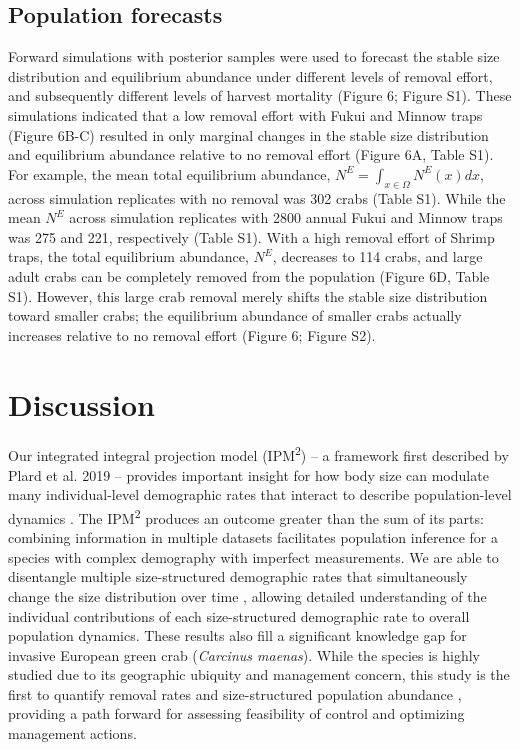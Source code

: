 \documentclass{article}
\begin{document}
\subsection{Population forecasts}

Forward simulations with posterior samples were used to forecast the stable size distribution and equilibrium abundance under different levels of removal effort, and subsequently different levels of harvest mortality (Figure 6; Figure S1). These simulations indicated that a low removal effort with Fukui and Minnow traps (Figure 6B-C) resulted in only marginal changes in the stable size distribution and equilibrium abundance relative to no removal effort (Figure 6A, Table S1). For example, the mean total equilibrium abundance, $N^{E} = \int_{x \in \Omega}N^E(x)dx$, across simulation replicates with no removal was 302 crabs (Table S1). While the mean $N^{E}$ across simulation replicates with 2800 annual Fukui and Minnow traps was 275 and 221, respectively (Table S1). With a high removal effort of Shrimp traps, the total equilibrium abundance, $N^{E}$, decreases to 114 crabs, and large adult crabs can be completely removed from the population (Figure 6D, Table S1). However, this large crab removal merely shifts the stable size distribution toward smaller crabs; the equilibrium abundance of smaller crabs actually increases relative to no removal effort (Figure 6; Figure S2).

\section{Discussion}

Our integrated integral projection model (IPM\textsuperscript{2}) – a framework first described by Plard et al. 2019 – provides important insight for how body size can modulate many individual-level demographic rates that interact to describe population-level dynamics \parencite{plard2019ipm}. The IPM\textsuperscript{2} produces an outcome greater than the sum of its parts: combining information in multiple datasets facilitates population inference for a species with complex demography with imperfect measurements. We are able to disentangle multiple size-structured demographic rates that simultaneously change the size distribution over time \parencite{sogard1997size, carlson2010bayesian}, allowing detailed understanding of the individual contributions of each size-structured demographic rate to overall population dynamics. These results also fill a significant knowledge gap for invasive European green crab (\textit{Carcinus maenas}). While the species is highly studied due to its geographic ubiquity and management concern, this study is the first to quantify removal rates and size-structured population abundance \parencite{young2019life}, providing a path forward for assessing feasibility of control and optimizing management actions.
\end{document}
